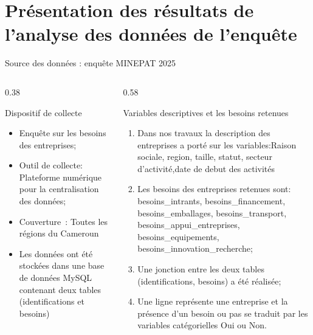 \documentclass[aspectratio=169, 10pt]{beamer}
\begin{document}
\section{Présentation des résultats de l'analyse des données de l'enquête }
\begin{frame}{Source des données : enquête MINEPAT 2025}
    \begin{columns}[T]
        \begin{column}{0.38\textwidth}
            \begin{block}{Dispositif de collecte}
                \begin{itemize}
                    \item Enquête sur les besoins des entreprises;
                    \item Outil de collecte: Plateforme numérique pour la centralisation des données;
                    \item Couverture~: Toutes les régions du Cameroun
                    \item Les données ont été stockées dans une base de données MySQL contenant deux tables (identifications et besoins)
                \end{itemize}
            \end{block}
        \end{column}
        \begin{column}{0.58\textwidth}
            \begin{block}{Variables descriptives et les besoins retenues }
                \begin{enumerate}
                    \item Dans nos travaux la description des entreprises a porté sur les variables:Raison sociale, region, taille, statut, secteur d'activité,date de debut des activités 
                    \item Les besoins des entreprises retenues sont:
                    besoins\_intrants, besoins\_financement, besoins\_emballages, besoins\_transport, besoins\_appui\_entreprises, besoins\_equipements, besoins\_innovation\_recherche;
                    \item Une jonction entre les deux tables (identifications, besoins) a été réalisée;
                    \item Une ligne représente une entreprise et la présence d'un besoin ou pas se traduit par les variables catégorielles Oui ou Non.
                \end{enumerate}
            \end{block}
        \end{column}
    \end{columns}
\end{frame}
\end{document}
